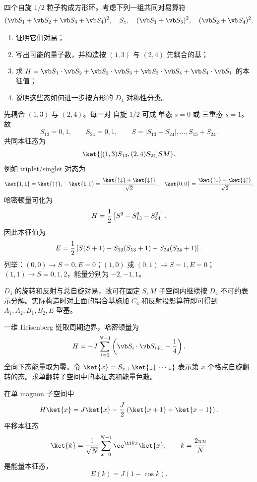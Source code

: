 \begin{question}
四个自旋 $1/2$ 粒子构成方形环。考虑下列一组共同对易算符
\[
  (\vb S_1+\vb S_2+\vb S_3+\vb S_4)^2,
  \quad S_z,
  \quad (\vb S_1+\vb S_3)^2,
  \quad (\vb S_2+\vb S_4)^2.
\]
\begin{enumerate}
  \item 证明它们对易；
  \item 写出可能的量子数，并构造按 $(1,3)$ 与 $(2,4)$ 先耦合的基；
  \item 求 $H=\vb S_1\cdot\vb S_2+\vb S_2\cdot\vb S_3+\vb S_3\cdot\vb S_4+\vb S_4\cdot\vb S_1$ 的本征值；
  \item 说明这些态如何进一步按方形的 $D_4$ 对称性分类。
\end{enumerate}
\begin{solution}
先耦合 $(1,3)$ 与 $(2,4)$。每一对 自旋 $1/2$ 可成 单态 $s=0$ 或 三重态 $s=1$。故
\[
  S_{13}=0,1,
  \qquad S_{24}=0,1,
  \qquad S=|S_{13}-S_{24}|,\ldots, S_{13}+S_{24}.
\]
共同本征态为
\[
  \ket{[(1,3)S_{13},(2,4)S_{24}]SM}.
\]
例如 triplet/singlet 对态为
\[
  \ket{1,1}=\ket{\uparrow\uparrow},
  \quad \ket{1,0}={\ket{\uparrow\downarrow}+\ket{\downarrow\uparrow}\over\sqrt2},
  \quad \ket{0,0}={\ket{\uparrow\downarrow}-\ket{\downarrow\uparrow}\over\sqrt2}.
\]
哈密顿量可化为
\[
  H={1\over2}\left[S^2-S_{13}^2-S_{24}^2\right].
\]
因此本征值为
\[
  E={1\over2}\left[S(S+1)-S_{13}(S_{13}+1)-S_{24}(S_{24}+1)\right].
\]
列举：$(0,0)\to S=0,E=0$；$(1,0)$ 或 $(0,1)\to S=1,E=0$；$(1,1)\to S=0,1,2$，能量分别为 $-2,-1,1$。

$D_4$ 的旋转和反射与总自旋对易，故可在固定 $S,M$ 子空间内继续按 $D_4$ 不可约表示分解。实际构造时对上面的耦合基施加 $C_4$ 和反射投影算符即可得到 $A_1,A_2,B_1,B_2,E$ 型基。
\end{solution}
\end{question}

\begin{question}
一维 Heisenberg 链取周期边界，哈密顿量为
\[
  H=-J\sum_{i=0}^{N-1}\left(\vb S_i\cdot\vb S_{i+1}-{1\over4}\right).
\]
全向下态能量取为零。令 $\ket{x}=S_{x,+}\ket{\downarrow\downarrow\cdots\downarrow}$ 表示第 $x$ 个格点自旋翻转的态。求单翻转子空间中的本征态和能量色散。
\begin{solution}
在单 magnon 子空间中
\[
  H\ket{x}=J\ket{x}-{J\over2}\left(\ket{x+1}+\ket{x-1}\right).
\]
平移本征态
\[
  \ket{k}={1\over\sqrt N}\sum_{x=0}^{N-1}\ee^{\ii kx}\ket{x},
  \qquad k={2\pi n\over N}
\]
是能量本征态，
\[
  E(k)=J(1-\cos k).
\]
\end{solution}
\end{question}
